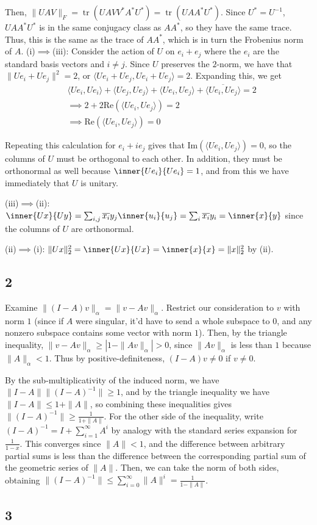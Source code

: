 \documentclass{article}
\newcommand{\conj}{\overline}
\DeclareMathOperator{\tr}{tr}
\begin{document}
Then, $\|UAV\|_F=\tr(UAVV^*A^*U^*)=\tr(UAA^*U^*)$. Since $U^*=U^{-1}$, $UAA^*U^*$ is in the same conjugacy class as $AA^*$, so they have the same trace. Thus, this is the same as the trace of $AA^*$, which is in turn the Frobenius norm of $A$.
(i)$\implies$(iii):
Consider the action of $U$ on $e_i+e_j$ where the $e_i$ are the standard basis vectors and $i\neq j$. Since $U$ preserves the $2$-norm, we have that $\|Ue_i+Ue_j\|^2=2$, or $\langle Ue_i+Ue_j,Ue_i+Ue_j\rangle=2$. Expanding this, we get 
\begin{align*}
    &\langle Ue_i,Ue_i\rangle+\langle Ue_j,Ue_j\rangle+\langle Ue_i,Ue_j\rangle+\conj{\langle Ue_i,Ue_j\rangle}=2\\
    &\implies2+2\text{Re}(\langle Ue_i,Ue_j\rangle)=2\\
    &\implies \text{Re}(\langle Ue_i,Ue_j\rangle)=0
\end{align*}

Repeating this calculation for $e_i+ie_j$ gives that $\text{Im}(\langle Ue_i,Ue_j\rangle)=0$, so the columns of $U$ must be orthogonal to each other. In addition, they must be orthonormal as well because $\inner{Ue_i}{Ue_i}=1$, and from this we have immediately that $U$ is unitary.

(iii)$\implies$(ii): $\inner{Ux}{Uy}=\sum_{i,j}\conj{x_i}y_j\inner{u_i}{u_j}=\sum_i\conj{x_i}y_i=\inner{x}{y}$ since the columns of $U$ are orthonormal.

(ii)$\implies$(i): $\|Ux\|_2^2=\inner{Ux}{Ux}=\inner{x}{x}=\|x\|_2^2$ by (ii).
\subsection*{2}
Examine $\|(I-A)v\|_\alpha=\|v-Av\|_\alpha$. Restrict our consideration to $v$ with norm $1$ (since if $A$ were singular, it'd have to send a whole subspace to $0$, and any nonzero subspace contains some vector with norm $1$). Then, by the triangle inequality, $\|v-Av\|_\alpha\geq\left|1-\|Av\|_\alpha\right|>0$, since $\|Av\|_\alpha$ is less than $1$ because $\|A\|_\alpha<1$. Thus by positive-definiteness, $(I-A)v\neq0$ if $v\neq0$.

By the sub-multiplicativity of the induced norm, we have $\|I-A\|\|(I-A)^{-1}\|\geq1$, and by the triangle inequality we have $\|I-A\|\leq1+\|A\|$, so combining these inequalities gives $\|(I-A)^{-1}\|\geq\frac{1}{1+\|A\|}$. For the other side of the inequality, write $(I-A)^{-1}=I+\sum_{i=1}^\infty A^i$ by analogy with the standard series expansion for $\frac{1}{1-x}$. This converges since $\|A\|<1$, and the difference between arbitrary partial sums is less than the difference between the corresponding partial sum of the geometric series of $\|A\|$. Then, we can take the norm of both sides, obtaining $\|(I-A)^{-1}\|\leq\sum_{i=0}^\infty\|A\|^i=\frac{1}{1-\|A\|}$.
\subsection*{3}
\end{document}
